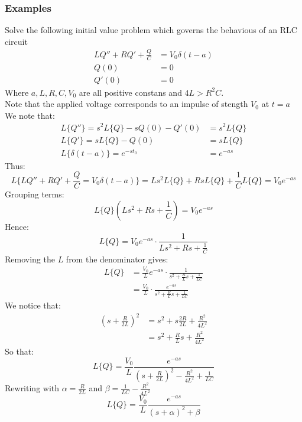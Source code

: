 \documentclass[a4paper, 10pt]{article}
\begin{document}
\subsubsection{Examples}
\begin{examplebox}{Solve the following initial value problem which governs the behavious of an RLC circuit}{}
  \scriptsize
  \begin{align*}
    LQ'' + RQ' + \frac{Q}{C} & = V_0 \delta(t-a) \\
    Q(0)                     & = 0               \\
    Q'(0)                    & = 0
  \end{align*}
  Where $a,L,R,C,V_0$ are all positive constans and $4L > R^2C$. \\
  Note that the applied voltage corresponds to an impulse of stength $V_0$ at $t=a$ \\
  We note that:
  \begin{align*}
    L\{Q''\} = s^2 L\{Q\} - sQ(0) - Q'(0) & = s^2 L\{Q\} \\
    L\{Q'\} = sL\{Q\} - Q(0)              & = sL\{Q\}    \\
    L\{\delta(t-a)\} = e^{-st_0}          & = e^{-as}
  \end{align*}
  Thus:
  $$L\{LQ'' + RQ' + \frac{Q}{C} = V_0 \delta(t-a)\} = Ls^2L\{Q\} + RsL\{Q\} + \frac{1}{C}L\{Q\} = V_0 e^{-as}$$
  Grouping terms:
  $$L\{Q\}(Ls^2 + Rs + \frac{1}{C}) = V_0 e^{-as}$$
  Hence:
  $$L\{Q\} = V_0 e^{-as} \cdot \frac{1}{Ls^2 + Rs + \frac{1}{C}}$$
  Removing the $L$ from the denominator gives:
  \begin{align*}
    L\{Q\} & = \frac{V_0}{L}e^{-as} \cdot \frac{1}{s^2 + \frac{R}{L}s + \frac{1}{LC}} \\
           & =\frac{V_0}{L}\cdot \frac{e^{-as}}{s^2 + \frac{R}{L}s + \frac{1}{LC}}
  \end{align*}
  We notice that:
  \begin{align*}
    (s+\frac{R}{2L})^2 & = s^2 + s \frac{2R}{2L} + \frac{R^2}{4L^2} \\
                       & = s^2 + \frac{R}{L}s + \frac{R^2}{4L^2}
  \end{align*}
  So that:
  $$L\{Q\} = \frac{V_0}{L} \frac{e^{-as}}{(s+\frac{R}{2L})^2 - \frac{R^2}{4L^2} + \frac{1}{LC}}$$
  Rewriting with $\alpha = \frac{R}{2L}$ and $\beta = \frac{1}{LC} - \frac{R^2}{4L^2}$
  $$L\{Q\} = \frac{V_0}{L} \frac{e^{-as}}{(s+\alpha)^2 + \beta}$$


\end{examplebox}
\end{document}
